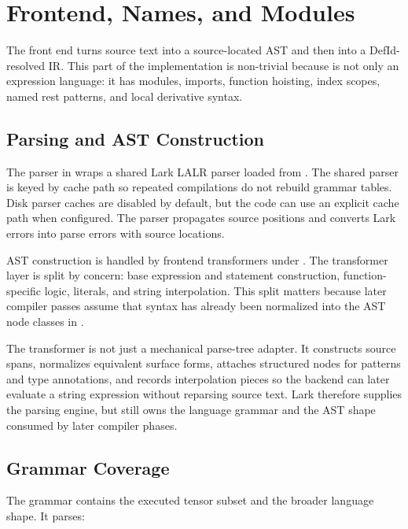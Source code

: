 \chapter{Frontend, Names, and Modules}

The front end turns source text into a source-located AST and then into a
DefId-resolved IR. This part of the implementation is non-trivial because
\einlang{} is not only an expression language: it has modules, imports,
function hoisting, index scopes, named rest patterns, and local derivative
syntax.

\section{Parsing and AST Construction}

The parser in  wraps a shared Lark LALR
parser loaded from . The shared
parser is keyed by cache path so repeated compilations do not rebuild grammar
tables. Disk parser caches are disabled by default, but the code can use an
explicit cache path when configured. The parser propagates source positions and
converts Lark errors into \einlang{} parse errors with source locations.

AST construction is handled by frontend transformers under
. The transformer layer is split by
concern: base expression and statement construction, function-specific logic,
literals, and string interpolation. This split matters because later compiler
passes assume that syntax has already been normalized into the AST node classes
in .

The transformer is not just a mechanical parse-tree adapter. It constructs
source spans, normalizes equivalent surface forms, attaches structured nodes for
patterns and type annotations, and records interpolation pieces so the backend
can later evaluate a string expression without reparsing source text. Lark
therefore supplies the parsing engine, but \einlang{} still owns the language
grammar and the AST shape consumed by later compiler phases.

\section{Grammar Coverage}

The grammar contains the executed tensor subset and the broader language shape.
It parses:

